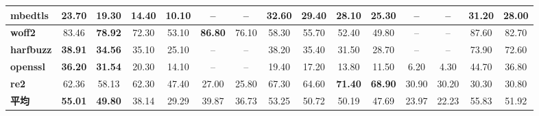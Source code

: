 \begin{table}[H]
{{\begin{tabular}{|l|cc|cc|cc|cc|cc|cc|cc|}
        \hline
        \textbf{mbedtls} & 23.70 & 19.30 & 14.40 & 10.10 & -- & -- & \textbf{32.60} & \textbf{29.40} & 28.10 & 25.30 & -- & -- & 31.20 & 28.00 \\
        \hline
        \textbf{woff2} & 83.46 & \textbf{78.92} & 72.30 & 53.10 & \textbf{86.80} & 76.10 & 58.30 & 55.70 & 52.40 & 49.80 & -- & -- & 87.60 & 82.70 \\
        \hline
        \textbf{harfbuzz} & \textbf{38.91} & \textbf{34.56} & 35.10 & 25.10 & -- & -- & 38.20 & 35.40 & 31.50 & 28.70 & -- & -- & 73.90 & 72.60 \\
        \hline
        \textbf{openssl} & \textbf{36.20} & \textbf{31.54} & 20.30 & 14.10 & -- & -- & 19.40 & 17.20 & 13.80 & 11.50 & 6.20 & 4.30 & 44.70 & 36.80 \\
        \hline
        \textbf{re2} & 62.36 & 58.13 & 62.30 & 47.40 & 27.00 & 25.80 & 67.30 & 64.60 & \textbf{71.40} & \textbf{68.90} & 30.90 & 30.20 & 30.30 & 30.80 \\
        \hline
        \textbf{平均} & \textbf{55.01} & \textbf{49.80} & 38.14 & 29.29 & 39.87 & 36.73 & 53.25 & 50.72 & 50.19 & 47.69 & 23.97 & 22.23 & 55.83 & 51.92 \\
        \hline
    \end{tabular}}}
    \label{tab:main-results}
\end{table}

